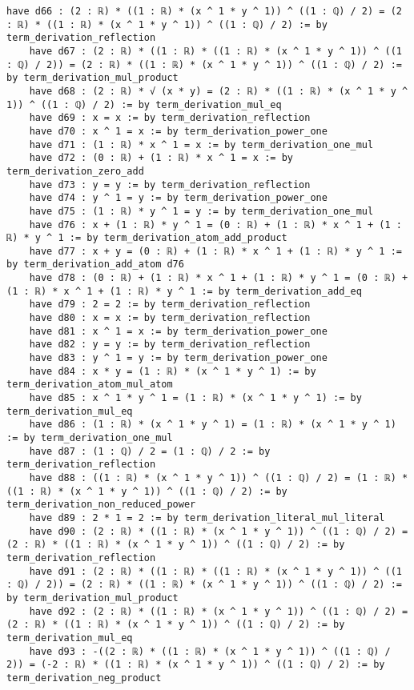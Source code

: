 \documentclass{article}
\begin{document}
\begin{tcolorbox}[colback=white!10, width=\linewidth]
\begin{lstlisting}[language=Lean4]
    have d66 : (2 : ℝ) * ((1 : ℝ) * (x ^ 1 * y ^ 1)) ^ ((1 : ℚ) / 2) = (2 : ℝ) * ((1 : ℝ) * (x ^ 1 * y ^ 1)) ^ ((1 : ℚ) / 2) := by term_derivation_reflection
    have d67 : (2 : ℝ) * ((1 : ℝ) * ((1 : ℝ) * (x ^ 1 * y ^ 1)) ^ ((1 : ℚ) / 2)) = (2 : ℝ) * ((1 : ℝ) * (x ^ 1 * y ^ 1)) ^ ((1 : ℚ) / 2) := by term_derivation_mul_product
    have d68 : (2 : ℝ) * √ (x * y) = (2 : ℝ) * ((1 : ℝ) * (x ^ 1 * y ^ 1)) ^ ((1 : ℚ) / 2) := by term_derivation_mul_eq
    have d69 : x = x := by term_derivation_reflection
    have d70 : x ^ 1 = x := by term_derivation_power_one
    have d71 : (1 : ℝ) * x ^ 1 = x := by term_derivation_one_mul
    have d72 : (0 : ℝ) + (1 : ℝ) * x ^ 1 = x := by term_derivation_zero_add
    have d73 : y = y := by term_derivation_reflection
    have d74 : y ^ 1 = y := by term_derivation_power_one
    have d75 : (1 : ℝ) * y ^ 1 = y := by term_derivation_one_mul
    have d76 : x + (1 : ℝ) * y ^ 1 = (0 : ℝ) + (1 : ℝ) * x ^ 1 + (1 : ℝ) * y ^ 1 := by term_derivation_atom_add_product
    have d77 : x + y = (0 : ℝ) + (1 : ℝ) * x ^ 1 + (1 : ℝ) * y ^ 1 := by term_derivation_add_atom d76
    have d78 : (0 : ℝ) + (1 : ℝ) * x ^ 1 + (1 : ℝ) * y ^ 1 = (0 : ℝ) + (1 : ℝ) * x ^ 1 + (1 : ℝ) * y ^ 1 := by term_derivation_add_eq
    have d79 : 2 = 2 := by term_derivation_reflection
    have d80 : x = x := by term_derivation_reflection
    have d81 : x ^ 1 = x := by term_derivation_power_one
    have d82 : y = y := by term_derivation_reflection
    have d83 : y ^ 1 = y := by term_derivation_power_one
    have d84 : x * y = (1 : ℝ) * (x ^ 1 * y ^ 1) := by term_derivation_atom_mul_atom
    have d85 : x ^ 1 * y ^ 1 = (1 : ℝ) * (x ^ 1 * y ^ 1) := by term_derivation_mul_eq
    have d86 : (1 : ℝ) * (x ^ 1 * y ^ 1) = (1 : ℝ) * (x ^ 1 * y ^ 1) := by term_derivation_one_mul
    have d87 : (1 : ℚ) / 2 = (1 : ℚ) / 2 := by term_derivation_reflection
    have d88 : ((1 : ℝ) * (x ^ 1 * y ^ 1)) ^ ((1 : ℚ) / 2) = (1 : ℝ) * ((1 : ℝ) * (x ^ 1 * y ^ 1)) ^ ((1 : ℚ) / 2) := by term_derivation_non_reduced_power
    have d89 : 2 * 1 = 2 := by term_derivation_literal_mul_literal
    have d90 : (2 : ℝ) * ((1 : ℝ) * (x ^ 1 * y ^ 1)) ^ ((1 : ℚ) / 2) = (2 : ℝ) * ((1 : ℝ) * (x ^ 1 * y ^ 1)) ^ ((1 : ℚ) / 2) := by term_derivation_reflection
    have d91 : (2 : ℝ) * ((1 : ℝ) * ((1 : ℝ) * (x ^ 1 * y ^ 1)) ^ ((1 : ℚ) / 2)) = (2 : ℝ) * ((1 : ℝ) * (x ^ 1 * y ^ 1)) ^ ((1 : ℚ) / 2) := by term_derivation_mul_product
    have d92 : (2 : ℝ) * ((1 : ℝ) * (x ^ 1 * y ^ 1)) ^ ((1 : ℚ) / 2) = (2 : ℝ) * ((1 : ℝ) * (x ^ 1 * y ^ 1)) ^ ((1 : ℚ) / 2) := by term_derivation_mul_eq
    have d93 : -((2 : ℝ) * ((1 : ℝ) * (x ^ 1 * y ^ 1)) ^ ((1 : ℚ) / 2)) = (-2 : ℝ) * ((1 : ℝ) * (x ^ 1 * y ^ 1)) ^ ((1 : ℚ) / 2) := by term_derivation_neg_product

\end{lstlisting}
\end{tcolorbox}
\end{document}
